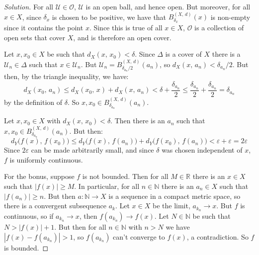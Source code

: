 \documentclass{article}
\theoremstyle{normal}
\begin{document}
    \begin{proof}[Solution]
        For all $\mathcal{U}\in\mathcal{O}$, $\mathcal{U}$ is an open ball, and
        hence open. But moreover, for all $x\in{X}$, since $\delta_{x}$ is
        chosen to be positive, we have that $B_{\delta_{x}}^{(X,\,d)}(x)$ is
        non-empty since it contains the point $x$. Since this is true of
        all $x\in{X}$, $\mathcal{O}$ is a collection of open sets that cover
        $X$, and is therefore an open cover.
        \par\hfill\par
        Let $x,x_{0}\in{X}$ be such that $d_{X}(x,\,x_{0})<\delta$. Since
        $\Delta$ is a cover of $X$ there is a $\mathcal{U}_{n}\in\Delta$ such
        that $x\in\mathcal{U}_{n}$. But
        $\mathcal{U}_{n}=B_{\delta_{a_{n}}/2}^{(X,\,d)}(a_{n})$, so
        $d_{X}(x,\,a_{n})<\delta_{a_{n}}/2$. But then, by the triangle
        inequality, we have:
        \begin{equation}
            d_{X}(x_{0},\,a_{n})
            \leq{d}_{X}(x_{0},\,x)+d_{X}(x,\,a_{n})
            <\delta+\frac{\delta_{a_{n}}}{2}
            \leq\frac{\delta_{a_{n}}}{2}+\frac{\delta_{a_{n}}}{2}
            =\delta_{a_{n}}
        \end{equation}
        by the definition of $\delta$. So
        $x,x_{0}\in{B}_{\delta_{a_{n}}}^{(X,\,d)}(a_{n})$.
        \par\hfill\par
        Let $x,x_{0}\in{X}$ with $d_{X}(x,\,x_{0})<\delta$. Then there is an
        $a_{n}$ such that $x,x_{0}\in{B}_{\delta_{a_{n}}}^{(X,\,d)}(a_{n})$. But
        then:
        \begin{equation}
            d_{Y}\big(f(x),\,f(x_{0})\big)
            \leq{d}_{Y}\big(f(x),\,f(a_{n})\big)
                +d_{Y}\big(f(x_{0}),\,f(a_{n})\big)
            <\varepsilon+\varepsilon
            =2\varepsilon
        \end{equation}
        Since $2\varepsilon$ can be made arbitrarily small, and since
        $\delta$ was chosen independent of $x$, $f$ is uniformly continuous.
        \par\hfill\par
        For the bonus, suppose $f$ is not bounded. Then for all $M\in\mathbb{R}$
        there is an $x\in{X}$ such that $|f(x)|\geq{M}$. In particular, for all
        $n\in\mathbb{N}$ there is an $a_{n}\in{X}$ such that
        $|f(a_{n})|\geq{n}$. But then $a:\mathbb{N}\rightarrow{X}$ is a
        sequence in a compact metric space, so there is a convergent
        subsequence $a_{k}$. Let $x\in{X}$ be the limit,
        $a_{k_{n}}\rightarrow{x}$. But $f$ is continuous, so if
        $a_{k_{n}}\rightarrow{x}$, then
        $f(a_{k_{n}})\rightarrow{f}(x)$. Let $N\in\mathbb{N}$ be such that
        $N>|f(x)|+1$. But then for all $n\in\mathbb{N}$ with $n>N$ we have
        $|f(x)-f(a_{k_{n}})|>1$, so $f(a_{k_{n}})$ can't converge to $f(x)$,
        a contradiction. So $f$ is bounded.
    \end{proof}
\end{document}

